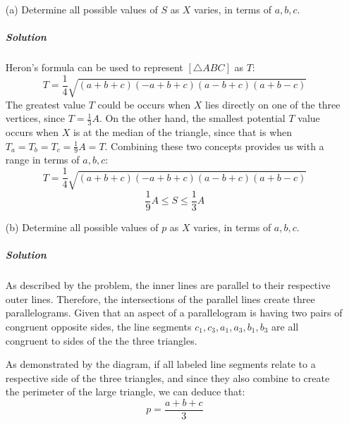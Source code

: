 \documentclass[a4paper]{amsart}
\begin{document}
\begin{flushleft}
		\begin{enumerate}
			\item[(a)] Determine all possible values of $S$ as $X$ varies, in terms of $a,b,c$.
			
			\subparagraph{\textbf{Solution}} Heron's formula can be used to represent $[\triangle ABC]$ as $T$:
			\[ T=\frac{1}{4}\sqrt{(a+b+c)(-a+b+c)(a-b+c)(a+b-c)} \]
			The greatest value $T$ could be occurs when $X$ lies directly on one of the three vertices, since $T=\frac{1}{3}A$. On the other hand, the smallest potential $T$ value occurs when $X$ is at the median of the triangle, since that is when $T_a=T_b=T_c=\frac{1}{9}A=T$. Combining these two concepts provides us with a range in terms of $a,b,c$:
			\[ T=\frac{1}{4}\sqrt{(a+b+c)(-a+b+c)(a-b+c)(a+b-c)} \]
			\[ \frac{1}{9}A\leq S\leq\frac{1}{3}A \]
			
			\item[(b)] Determine all possible values of $p$ as $X$ varies, in terms of $a,b,c$.
			
			\subparagraph{\textbf{Solution}} As described by the problem, the inner lines are parallel to their respective outer lines. Therefore, the intersections of the parallel lines create three parallelograms. Given that an aspect of a parallelogram is having two pairs of congruent opposite sides, the line segments $c_1,c_3,a_1,a_3,b_1,b_3$ are all congruent to sides of the the three triangles.
			\begin{center}
				
				As demonstrated by the diagram, if all labeled line segments relate to a respective side of the three triangles, and since they also combine to create the perimeter of the large triangle, we can deduce that:
				\[ p=\frac{a+b+c}{3} \]
			\end{center}
		\end{enumerate}
	\end{flushleft}
\end{document}
